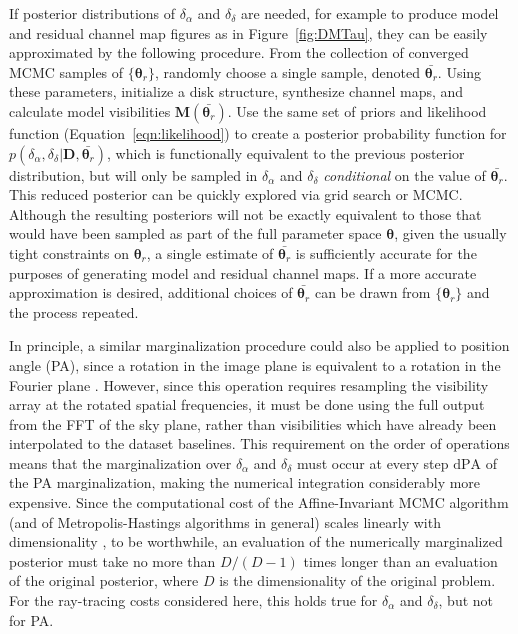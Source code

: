 \documentclass[modern]{aastex62}
\begin{document}
If posterior distributions of $\delta_\alpha$ and $\delta_\delta$ are needed, for example to produce model and residual channel map figures as in Figure~\ref{fig:DMTau}, they can be easily approximated by the following procedure. From the collection of converged MCMC samples of $\{ {\bm \theta}_r\}$, randomly choose a single sample, denoted $\bar{{\bm \theta}_r}$. Using these parameters, initialize a disk structure, synthesize channel maps, and calculate model visibilities ${\bm M}(\bar{{\bm \theta}_r})$.
Use the same set of priors and likelihood function (Equation~\ref{eqn:likelihood}) to create a posterior probability function for $p(\delta_\alpha, \delta_\delta | {\bm D}, \bar{{\bm \theta}_r})$, which is functionally equivalent to the previous posterior distribution, but will only be sampled in $\delta_\alpha$ and $\delta_\delta$ \emph{conditional} on the value of $\bar{{\bm \theta}_r}$. This reduced posterior can be quickly explored via grid search or MCMC.
Although the resulting posteriors will not be exactly equivalent to those that would have been sampled as part of the full parameter space ${\bm \theta}$, given the usually tight constraints on ${\bm \theta}_r$, a single estimate of $\bar{{\bm \theta}_r}$ is sufficiently accurate for the purposes of generating model and residual channel maps. If a more accurate approximation is desired, additional choices of $\bar{{\bm \theta}_r}$ can be drawn from $\{ {\bm \theta}_r\}$ and the process repeated.

In principle, a similar marginalization procedure could also be applied to position angle (PA), since a rotation in the image plane is equivalent to a rotation in the Fourier plane \citep{bracewell00}. However, since this operation requires resampling the visibility array at the rotated spatial frequencies, it must be done using the full output from the FFT of the sky plane, rather than visibilities which have already been interpolated to the dataset baselines.
This requirement on the order of operations means that the marginalization over $\delta_\alpha$ and $\delta_\delta$ must occur at every step $\mathrm{d}\mathrm{PA}$ of the PA marginalization, making the numerical integration considerably more expensive. Since the computational cost of the Affine-Invariant MCMC algorithm (and of Metropolis-Hastings algorithms in general) scales linearly with dimensionality \citep{dunkley05,allison14}, to be worthwhile, an evaluation of the numerically marginalized posterior must take no more than $D/(D - 1)$ times longer than an evaluation of the original posterior, where $D$ is the dimensionality of the original problem. For the ray-tracing costs considered here, this holds true for $\delta_\alpha$ and $\delta_\delta$, but not for PA.
\end{document}
